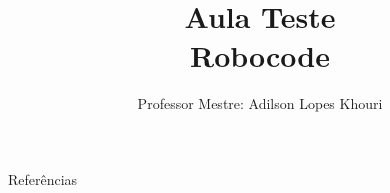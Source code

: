 \documentclass[compress, hyperref={pdfpagelayout=SinglePage}]{beamer}
\title[Aula Teste]{Aula Teste \\ Robocode}
\author{Professor Mestre: Adilson Lopes Khouri}
\begin{document}
	\begin{frame}
		\titlepage
	\end{frame}

	
		
	
	
		

	

	

	\begin{frame}{}
		\begin{block}{Referências}
			\tiny
			\nocite{*}
			
	    		
		\end{block}
	\end{frame}
\end{document}
